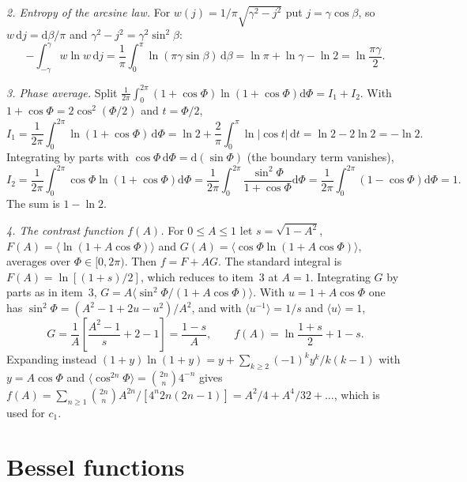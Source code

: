 \documentclass[aps,pra,onecolumn,notitlepage,nofootinbib,11pt]{revtex4-2}
\newcommand{\dd}{\mathrm{d}}
\begin{document}
\emph{2. Entropy of the arcsine law.} For $w(j)=1/\pi\sqrt{\gamma^{2}-j^{2}}$ put
$j=\gamma\cos\beta$, so $w\,\dd j=\dd\beta/\pi$ and $\gamma^{2}-j^{2}=\gamma^{2}\sin^{2}\beta$:
\begin{equation}
-\int_{-\gamma}^{\gamma}w\ln w\,\dd j=\frac1\pi\int_{0}^{\pi}\ln(\pi\gamma\sin\beta)\,\dd\beta
=\ln\pi+\ln\gamma-\ln2=\ln\frac{\pi\gamma}{2}.
\end{equation}

\emph{3. Phase average.} Split
$\frac{1}{2\pi}\int_{0}^{2\pi}(1+\cos\Phi)\ln(1+\cos\Phi)\dd\Phi=I_{1}+I_{2}$. With
$1+\cos\Phi=2\cos^{2}(\Phi/2)$ and $t=\Phi/2$,
\begin{equation}
I_{1}=\frac{1}{2\pi}\int_{0}^{2\pi}\ln(1+\cos\Phi)\,\dd\Phi=\ln2+\frac{2}{\pi}\int_{0}^{\pi}\ln|\cos t|\,\dd t
=\ln2-2\ln2=-\ln2 .
\end{equation}
Integrating by parts with $\cos\Phi\,\dd\Phi=\dd(\sin\Phi)$ (the boundary term vanishes),
\begin{equation}
I_{2}=\frac{1}{2\pi}\int_{0}^{2\pi}\cos\Phi\ln(1+\cos\Phi)\dd\Phi
=\frac{1}{2\pi}\int_{0}^{2\pi}\frac{\sin^{2}\Phi}{1+\cos\Phi}\dd\Phi
=\frac{1}{2\pi}\int_{0}^{2\pi}(1-\cos\Phi)\dd\Phi=1 .
\end{equation}
The sum is $1-\ln2$.

\emph{4. The contrast function $f(A)$.}
\label{app:fA}
For $0\le A\le1$ let $s=\sqrt{1-A^{2}}$, $F(A)=\langle\ln(1+A\cos\Phi)\rangle$ and
$G(A)=\langle\cos\Phi\ln(1+A\cos\Phi)\rangle$, averages over $\Phi\in[0,2\pi)$. Then
$f=F+AG$. The standard integral is $F(A)=\ln[(1+s)/2]$, which reduces to item~3 at
$A=1$. Integrating $G$ by parts as in item~3, $G=A\langle\sin^{2}\Phi/(1+A\cos\Phi)\rangle$.
With $u=1+A\cos\Phi$ one has $\sin^{2}\Phi=(A^{2}-1+2u-u^{2})/A^{2}$, and with
$\langle u^{-1}\rangle=1/s$ and $\langle u\rangle=1$,
\begin{equation}
G=\frac{1}{A}\left[\frac{A^{2}-1}{s}+2-1\right]=\frac{1-s}{A},\qquad
f(A)=\ln\frac{1+s}{2}+1-s .
\end{equation}
Expanding instead $(1+y)\ln(1+y)=y+\sum_{k\ge2}(-1)^{k}y^{k}/k(k-1)$ with $y=A\cos\Phi$ and
$\langle\cos^{2n}\Phi\rangle=\binom{2n}{n}4^{-n}$ gives
$f(A)=\sum_{n\ge1}\binom{2n}{n}A^{2n}/[4^{n}2n(2n-1)]=A^{2}/4+A^{4}/32+\dots$, which is used for
$c_{1}$.

\section{Bessel functions}
\label{app:bessel}
\end{document}
